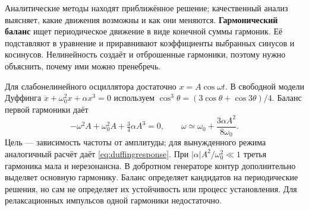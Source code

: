 Аналитические методы находят приближённое решение; качественный анализ выясняет, какие движения возможны и как они меняются. \textbf{Гармонический баланс} ищет периодическое движение в виде конечной суммы гармоник. Её подставляют в уравнение и приравнивают коэффициенты выбранных синусов и косинусов. Нелинейность создаёт и отброшенные гармоники, поэтому нужно объяснить, почему ими можно пренебречь.

Для слабонелинейного осциллятора достаточно $x=A\cos\omega t$. В свободной модели Дуффинга $\ddot x+\omega_0^2x+\alpha x^3=0$ используем $\cos^3\theta=(3\cos\theta+\cos3\theta)/4$. Баланс первой гармоники даёт
\begin{equation}
 -\omega^2A+\omega_0^2A+\tfrac34\alpha A^3=0,
 \qquad \omega\simeq\omega_0+\frac{3\alpha A^2}{8\omega_0}.
\end{equation}
Цель --- зависимость частоты от амплитуды; для вынужденного режима аналогичный расчёт даёт \eqref{eq:duffingresponse}. При $|\alpha|A^2/\omega_0^2\ll1$ третья гармоника мала и нерезонансна. В добротном генераторе контур дополнительно выделяет основную гармонику. Баланс определяет кандидатов на периодические решения, но сам не определяет их устойчивость или процесс установления. Для релаксационных импульсов одной гармоники недостаточно.
